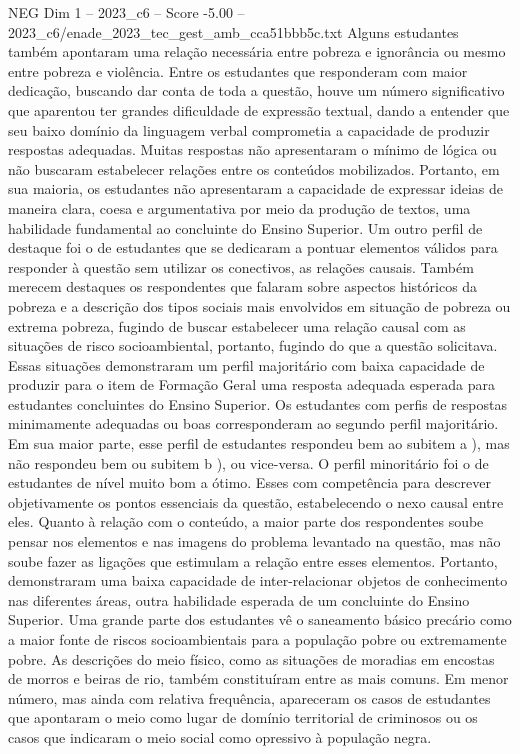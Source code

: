 \begin{textsample}{NEG Dim 1 – 2023\_c6 – Score -5.00 – 2023\_c6/enade\_2023\_tec\_gest\_amb\_cca51bbb5c.txt}
Alguns estudantes também apontaram uma relação necessária entre pobreza e ignorância ou mesmo entre pobreza e violência.
Entre os estudantes que responderam com maior dedicação, buscando dar conta de toda a questão, houve um número significativo que aparentou ter grandes dificuldade de expressão textual, dando a entender que seu baixo domínio da linguagem verbal comprometia a capacidade de produzir respostas adequadas.
Muitas respostas não apresentaram o mínimo de lógica ou não buscaram estabelecer relações entre os conteúdos mobilizados.
Portanto, em sua maioria, os estudantes não apresentaram a capacidade de expressar ideias de maneira clara, coesa e argumentativa por meio da produção de textos, uma habilidade fundamental ao concluinte do Ensino Superior.
Um outro perfil de destaque foi o de estudantes que se dedicaram a pontuar elementos válidos para responder à questão sem utilizar os conectivos, as relações causais.
Também merecem destaques os respondentes que falaram sobre aspectos históricos da pobreza e a descrição dos tipos sociais mais envolvidos em situação de pobreza ou extrema pobreza, fugindo de buscar estabelecer uma relação causal com as situações de risco socioambiental, portanto, fugindo do que a questão solicitava.
Essas situações demonstraram um perfil majoritário com baixa capacidade de produzir para o item de Formação Geral uma resposta adequada esperada para estudantes concluintes do Ensino Superior.
Os estudantes com perfis de respostas minimamente adequadas ou boas corresponderam ao segundo perfil majoritário.
Em sua maior parte, esse perfil de estudantes respondeu bem ao subitem a ), mas não respondeu bem ou subitem b ), ou vice-versa.
O perfil minoritário foi o de estudantes de nível muito bom a ótimo.
Esses com competência para descrever objetivamente os pontos essenciais da questão, estabelecendo o nexo causal entre eles.
Quanto à relação com o conteúdo, a maior parte dos respondentes soube pensar nos elementos e nas imagens do problema levantado na questão, mas não soube fazer as ligações que estimulam a relação entre esses elementos.
Portanto, demonstraram uma baixa capacidade de inter-relacionar objetos de conhecimento nas diferentes áreas, outra habilidade esperada de um concluinte do Ensino Superior.
Uma grande parte dos estudantes vê o saneamento básico precário como a maior fonte de riscos socioambientais para a população pobre ou extremamente pobre.
As descrições do meio físico, como as situações de moradias em encostas de morros e beiras de rio, também constituíram entre as mais comuns.
Em menor número, mas ainda com relativa frequência, apareceram os casos de estudantes que apontaram o meio como lugar de domínio territorial de criminosos ou os casos que indicaram o meio social como opressivo à população negra.

\end{textsample}
